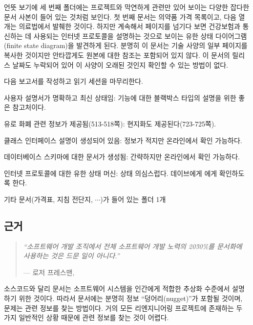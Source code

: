 \documentclass[a4paper,10pt,twoside]{book}
\begin{document}
언뜻 보기에 세 번째 폴더에는 프로젝트와 막연하게 관련만 있어 보이는 다양한 잡다한 문서 사본이 들어 있는 것처럼 보인다. 첫 번째 문서는 의약품 가격 목록이고, 다음 열 개는 의료법에서 발췌한 것이다. 하지만 계속해서 페이지를 넘기다 보면 건강보험과 통신하는 데 사용되는 인터넷 프로토콜을 설명하는 것으로 보이는 유한 상태 다이어그램(finite state diagram)을 발견하게 된다. 분명히 이 문서는 기술 사양의 일부 페이지를 복사한 것이지만 안타깝게도 원본에 대한 참조는 포함되어 있지 않다. 이 문서의 릴리스 날짜도 누락되어 있어 이 사양이 오래된 것인지 확인할 수 있는 방법이 없다.

다음 보고서를 작성하고 읽기 세션을 마무리한다.

\begin{bulletlist}
  \item 사용자 설명서가 명확하고 최신 상태임: 기능에 대한 블랙박스 타입의 설명을 위한 좋은 참고처이다.

  \item 유로 화폐 관련 정보가 제공됨(513-518쪽): 현지화도 제공된다(723-725쪽).

  \item 클래스 인터페이스 설명이 생성되어 있음: 정보가 적지만 온라인에서 확인 가능하다.

  \item 데이터베이스 스키마에 대한 문서가 생성됨: 간략하지만 온라인에서 확인 가능하다.

  \item 인터넷 프로토콜에 대한 유한 상태 머신: 상태 의심스럽다. 데이브에게 에게 확인하도록 한다.

  \item 기타 문서(가격표, 지침 전단지, $\cdots$)가 들어 있는 폴더 1개
\end{bulletlist}

\subsection*{근거}

\begin{quotation}
\noindent
\emph{``소프트웨어 개발 조직에서 전체 소프트웨어 개발 노력의 20\~30\%를 문서화에 사용하는 것은 드문 일이 아니다.''}

\hfill --- 로저 프레스맨, \cite{Pres94a} 
\end{quotation}

소스코드와 달리 문서는 소프트웨어 시스템을 인간에게 적합한 추상화 수준에서 설명하기 위한 것이다. 따라서 문서에는 분명히 정보 ``덩어리(nugget)''가 포함될 것이며, 문제는 관련 정보를 찾는 방법이다. 거의 모든 리엔지니어링 프로젝트에 존재하는 두 가지 일반적인 상황 때문에 관련 정보를 찾는 것이 어렵다.
\end{document}
